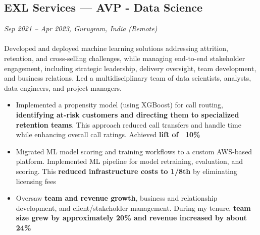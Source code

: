 \subsection*{EXL Services — AVP - Data Science}
\textit{Sep 2021 – Apr 2023, Gurugram, India (Remote)}
\\
\\
Developed and deployed machine learning solutions addressing attrition, retention, and cross-selling challenges, while managing end-to-end stakeholder engagement, including strategic leadership, delivery oversight, team development, and business relations. Led a multidisciplinary team of data scientists, analysts, data engineers, and project managers.
\begin{itemize}[leftmargin=1em]
    \item Implemented a propensity model (using XGBoost) for call routing, \textbf{identifying at-risk customers and directing them to specialized retention teams}. This approach reduced call transfers and handle time while enhancing overall call ratings. Achieved \textbf{lift of ~10\%}
    \item Migrated ML model scoring and training workflows to a custom AWS-based platform. Implemented ML pipeline for model retraining, evaluation, and scoring. This \textbf{reduced infrastructure costs to 1/8th} by eliminating licensing fees
    \item Oversaw \textbf{team and revenue growth}, business and relationship development, and client/stakeholder management. During my tenure, \textbf{team size grew by approximately 20\% and revenue increased by about 24\%}
\end{itemize}
